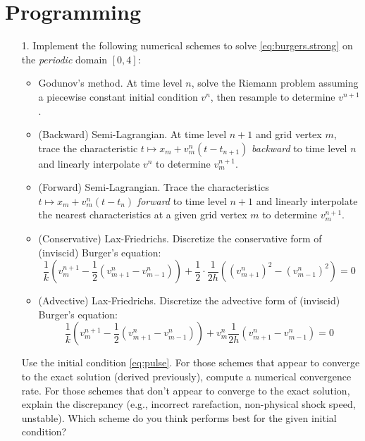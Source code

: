 \documentclass{article}
\begin{document}
\section{Programming}

\begin{itemize}

\item[1.] Implement the following numerical schemes to solve \eqref{eq:burgers.strong} on the \emph{periodic} domain $[0,4]$:
\begin{itemize}
\item Godunov's method. At time level $n$, solve the Riemann problem assuming a piecewise constant initial condition $v^n$, then resample to determine $v^{n+1}$.
\item (Backward) Semi-Lagrangian. At time level $n+1$ and grid vertex $m$, trace the characteristic $t \mapsto x_m + v^n_m \left( t - t_{n+1} \right)$ \emph{backward} to time level $n$ and linearly interpolate $v^n$ to determine $v^{n+1}_m$.
\item (Forward) Semi-Lagrangian. Trace the characteristics $t \mapsto x_m + v^n_m \left( t - t_n \right)$ \emph{forward} to time level $n+1$ and linearly interpolate the nearest characteristics at a given grid vertex $m$ to determine $v^{n+1}_m$.
\item (Conservative) Lax-Friedrichs. Discretize the conservative form of (inviscid) Burger's equation:
\begin{equation*}
\frac{1}{k} \left( v^{n+1}_m - \frac{1}{2} \left( v^n_{m+1} - v^n_{m-1} \right) \right) + \frac{1}{2} \cdot \frac{1}{2h} \left( \left( v^n_{m+1} \right)^2 - \left( v^n_{m-1} \right)^2 \right) = 0
\end{equation*}
\item (Advective) Lax-Friedrichs. Discretize the advective form of (inviscid) Burger's equation:
\begin{equation*}
\frac{1}{k} \left( v^{n+1}_m - \frac{1}{2} \left( v^n_{m+1} - v^n_{m-1} \right) \right) + v^n_m \frac{1}{2h} \left( v^n_{m+1} - v^n_{m-1} \right) = 0
\end{equation*}
\end{itemize}
Use the initial condition \eqref{eq:pulse}. For those schemes that appear to converge to the exact solution (derived previously), compute a numerical convergence rate. For those schemes that don't appear to converge to the exact solution, explain the discrepancy (e.g., incorrect rarefaction, non-physical shock speed, unstable). Which scheme do you think performs best for the given initial condition?


\end{itemize}
\end{document}
